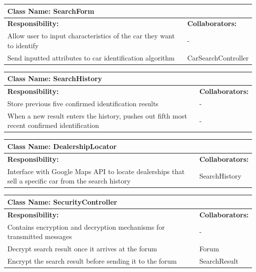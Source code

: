 \documentclass[12pt]{article}
\begin{document}
	\begin{table}[ht]
		\centering
		\begin{tabular}{|p{5cm}|p{5cm}|}
			\hline 
			\multicolumn{2}{|l|}{\textbf{Class Name:} SearchForm} \\
			\hline
			\textbf{Responsibility:} & \textbf{Collaborators:} \\
			\hline
			Allow user to input characteristics of the car they want to identify & -\\
			\hline
			Send inputted attributes to car identification algorithm & CarSearchController\\
			\hline
		\end{tabular}
	\end{table}

	\begin{table}[ht]
		\centering
		\begin{tabular}{|p{5cm}|p{5cm}|}
			\hline 
			\multicolumn{2}{|l|}{\textbf{Class Name:} SearchHistory} \\
			\hline
			\textbf{Responsibility:} & \textbf{Collaborators:} \\
			\hline
			Store previous five confirmed identification results & -\\
			\hline
			When a new result enters the history, pushes out fifth most recent confirmed identification & -\\
			\hline
		\end{tabular}
	\end{table}

	\begin{table}[ht]
		\centering
		\begin{tabular}{|p{5cm}|p{5cm}|}
			\hline 
			\multicolumn{2}{|l|}{\textbf{Class Name:} DealershipLocator} \\
			\hline
			\textbf{Responsibility:} & \textbf{Collaborators:} \\
			\hline
			Interface with Google Maps API to locate dealerships that sell a specific car from the search history & SearchHistory\\
			\hline
		\end{tabular}
	\end{table}

	\begin{table}[ht]
		\centering
		\begin{tabular}{|p{5cm}|p{5cm}|}
			\hline 
			\multicolumn{2}{|l|}{\textbf{Class Name:} SecurityController} \\
			\hline
			\textbf{Responsibility:} & \textbf{Collaborators:} \\
			\hline
			Contains encryption and decryption mechanisms for transmitted messages & -\\
			\hline
			Decrypt search result once it arrives at the forum & Forum\\
			\hline
			Encrypt the search result before sending it to the forum & SearchResult\\
			\hline
		\end{tabular}
	\end{table}
\end{document}
